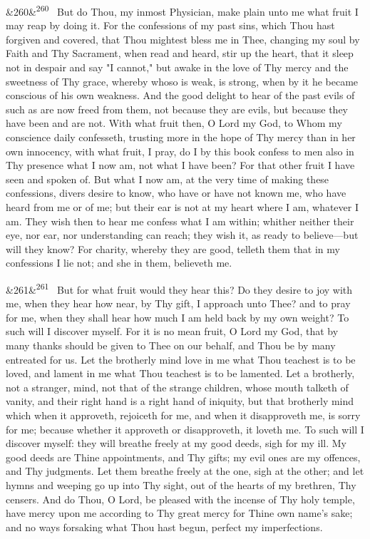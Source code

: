 \documentclass[12pt]{article}
\newcommand{\para}[1][]{\par\noindent\ifx&#1&\else\textsuperscript{\footnotesize #1}~\fi}
\begin{document}
\para[260] But do Thou, my inmost Physician, make plain unto me what fruit I may reap by doing it. For the confessions of my past sins, which Thou hast forgiven and covered, that Thou mightest bless me in Thee, changing my soul by Faith and Thy Sacrament, when read and heard, stir up the heart, that it sleep not in despair and say "I cannot," but awake in the love of Thy mercy and the sweetness of Thy grace, whereby whoso is weak, is strong, when by it he became conscious of his own weakness. And the good delight to hear of the past evils of such as are now freed from them, not because they are evils, but because they have been and are not. With what fruit then, O Lord my God, to Whom my conscience daily confesseth, trusting more in the hope of Thy mercy than in her own innocency, with what fruit, I pray, do I by this book confess to men also in Thy presence what I now am, not what I have been? For that other fruit I have seen and spoken of. But what I now am, at the very time of making these confessions, divers desire to know, who have or have not known me, who have heard from me or of me; but their ear is not at my heart where I am, whatever I am. They wish then to hear me confess what I am within; whither neither their eye, nor ear, nor understanding can reach; they wish it, as ready to believe---but will they know? For charity, whereby they are good, telleth them that in my confessions I lie not; and she in them, believeth me.

\para[261] But for what fruit would they hear this? Do they desire to joy with me, when they hear how near, by Thy gift, I approach unto Thee? and to pray for me, when they shall hear how much I am held back by my own weight? To such will I discover myself. For it is no mean fruit, O Lord my God, that by many thanks should be given to Thee on our behalf, and Thou be by many entreated for us. Let the brotherly mind love in me what Thou teachest is to be loved, and lament in me what Thou teachest is to be lamented. Let a brotherly, not a stranger, mind, not that of the strange children, whose mouth talketh of vanity, and their right hand is a right hand of iniquity, but that brotherly mind which when it approveth, rejoiceth for me, and when it disapproveth me, is sorry for me; because whether it approveth or disapproveth, it loveth me. To such will I discover myself: they will breathe freely at my good deeds, sigh for my ill. My good deeds are Thine appointments, and Thy gifts; my evil ones are my offences, and Thy judgments. Let them breathe freely at the one, sigh at the other; and let hymns and weeping go up into Thy sight, out of the hearts of my brethren, Thy censers. And do Thou, O Lord, be pleased with the incense of Thy holy temple, have mercy upon me according to Thy great mercy for Thine own name's sake; and no ways forsaking what Thou hast begun, perfect my imperfections.
\end{document}
